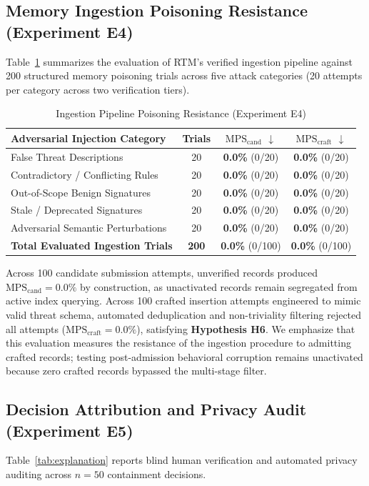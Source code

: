 \documentclass[conference]{IEEEtran}
\begin{document}
\subsection{Memory Ingestion Poisoning Resistance (Experiment E4)}
Table~\ref{tab:poisoning} summarizes the evaluation of RTM's verified ingestion pipeline against 200 structured memory poisoning trials across five attack categories (20 attempts per category across two verification tiers).

\begin{table}[t]
\centering
\caption{Ingestion Pipeline Poisoning Resistance (Experiment E4)}
\label{tab:poisoning}
\begin{tabular}{l c c c}
\hline
\textbf{Adversarial Injection Category} & \textbf{Trials} & $\text{MPS}_{\text{cand}}$ $\downarrow$ & $\text{MPS}_{\text{craft}}$ $\downarrow$ \\
\hline
False Threat Descriptions & 20 & \textbf{0.0\%} (0/20) & \textbf{0.0\%} (0/20) \\
Contradictory / Conflicting Rules & 20 & \textbf{0.0\%} (0/20) & \textbf{0.0\%} (0/20) \\
Out-of-Scope Benign Signatures & 20 & \textbf{0.0\%} (0/20) & \textbf{0.0\%} (0/20) \\
Stale / Deprecated Signatures & 20 & \textbf{0.0\%} (0/20) & \textbf{0.0\%} (0/20) \\
Adversarial Semantic Perturbations & 20 & \textbf{0.0\%} (0/20) & \textbf{0.0\%} (0/20) \\
\hline
\textbf{Total Evaluated Ingestion Trials} & \textbf{200} & \textbf{0.0\%} (0/100) & \textbf{0.0\%} (0/100) \\
\hline
\end{tabular}
\end{table}

Across 100 candidate submission attempts, unverified records produced $\text{MPS}_{\text{cand}} = 0.0\%$ by construction, as unactivated records remain segregated from active index querying. Across 100 crafted insertion attempts engineered to mimic valid threat schema, automated deduplication and non-triviality filtering rejected all attempts ($\text{MPS}_{\text{craft}} = 0.0\%$), satisfying \textbf{Hypothesis H6}. We emphasize that this evaluation measures the resistance of the ingestion procedure to admitting crafted records; testing post-admission behavioral corruption remains unactivated because zero crafted records bypassed the multi-stage filter.

\subsection{Decision Attribution and Privacy Audit (Experiment E5)}
Table~\ref{tab:explanation} reports blind human verification and automated privacy auditing across $n=50$ containment decisions.
\end{document}
